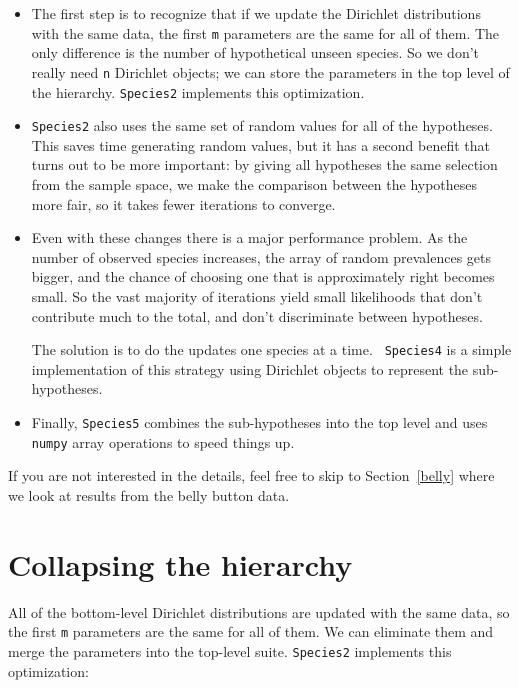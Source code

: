 \documentclass[12pt]{book}
\theoremstyle{exercise}
\newcommand{\py}[1]{{\tt #1}}%
\begin{document}
\begin{itemize}

\item The first step is to recognize that if we update the Dirichlet
  distributions with the same data, the first \py{m} parameters are
  the same for all of them.  The only difference is the number of
  hypothetical unseen species.  So we don't really need \py{n}
  Dirichlet objects; we can store the parameters in the top level of
  the hierarchy.  \py{Species2} implements this optimization.

\item \py{Species2} also uses the same set of random values for all
  of the hypotheses.  This saves time generating random values, but it
  has a second benefit that turns out to be more important: by giving
  all hypotheses the same selection from the sample space, we make
  the comparison between the hypotheses more fair, so it takes
  fewer iterations to converge.

\item Even with these changes there is a major performance problem.
  As the number of observed species increases, the array of random
  prevalences gets bigger, and the chance of choosing one that is
  approximately right becomes small.  So the vast majority of
  iterations yield small likelihoods that don't contribute much to the
  total, and don't discriminate between hypotheses.

  The solution is to do the updates one species at a time.  {\tt
  Species4} is a simple implementation of this strategy using
  Dirichlet objects to represent the sub-hypotheses.

\item Finally, \py{Species5} combines the sub-hypotheses into the top
  level and uses \py{numpy} array operations to speed things up.

\end{itemize}

If you are not interested in the details, feel free to skip to
Section~\ref{belly} where we look at results from the belly
button data.


\section{Collapsing the hierarchy}
\label{collapsing}

All of the bottom-level Dirichlet distributions are updated
with the same data, so the first \py{m} parameters are the same for
all of them.
We can eliminate them and merge the parameters into
the top-level suite.  \py{Species2} implements this optimization:
\end{document}
